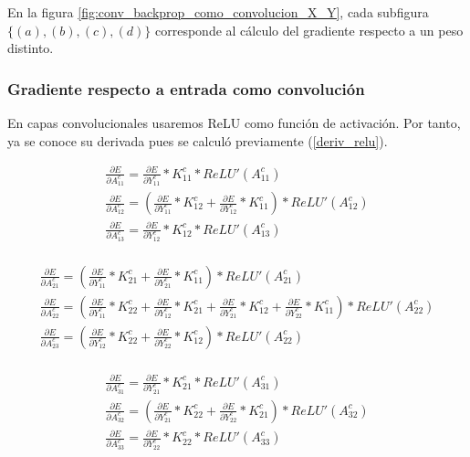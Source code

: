 En la figura \ref{fig:conv_backprop_como_convolucion_X_Y}, cada subfigura $\{(a), (b), (c), (d)\}$ corresponde al cálculo del gradiente respecto a un peso distinto.

\subsubsection{Gradiente respecto a entrada como convolución}

En capas convolucionales usaremos ReLU como función de activación. Por tanto, ya se conoce su derivada pues se calculó previamente (\ref{deriv_relu}).


\begin{gather}
	\frac{\partial E}{\partial A^c_{11}} = \frac{\partial E}{\partial Y^c_{11}} * K^c_{11} *  ReLU'(A^c_{11}) \\
	\frac{\partial E}{\partial A^c_{12}} = (\frac{\partial E}{\partial Y^c_{11}} * K^c_{12} + \frac{\partial E}{\partial Y^c_{12}} * K^c_{11}) * ReLU'(A^c_{12}) \\
	\frac{\partial E}{\partial A^c_{13}} = \frac{\partial E}{\partial Y^c_{12}} * K^c_{12} * ReLU'(A^c_{13}) \\
\end{gather}

\begin{gather}
	\frac{\partial E}{\partial A^c_{21}} = (\frac{\partial E}{\partial Y^c_{11}} * K^c_{21} + \frac{\partial E}{\partial Y^c_{21}} * K^c_{11}) * ReLU'(A^c_{21}) \\
	\frac{\partial E}{\partial A^c_{22}} = (\frac{\partial E}{\partial Y^c_{11}} * K^c_{22} + \frac{\partial E}{\partial Y^c_{12}} * K^c_{21} + \frac{\partial E}{\partial Y^c_{21}} * K^c_{12} + \frac{\partial E}{\partial Y^c_{22}} * K^c_{11}) * ReLU'(A^c_{22}) \\
	\frac{\partial E}{\partial A^c_{23}} = (\frac{\partial E}{\partial Y^c_{12}} * K^c_{22} + \frac{\partial E}{\partial Y^c_{22}} * K^c_{12}) * ReLU'(A^c_{22})\\
\end{gather}

\begin{gather}
	\frac{\partial E}{\partial A^c_{31}} = \frac{\partial E}{\partial Y^c_{21}} * K^c_{21} * ReLU'(A^c_{31})\\
	\frac{\partial E}{\partial A^c_{32}} = (\frac{\partial E}{\partial Y^c_{21}} * K^c_{22} + \frac{\partial E}{\partial Y^c_{22}} * K^c_{21}) * ReLU'(A^c_{32})\\
	\frac{\partial E}{\partial A^c_{33}} = \frac{\partial E}{\partial Y^c_{22}} * K^c_{22} * ReLU'(A^c_{33})
\end{gather}

